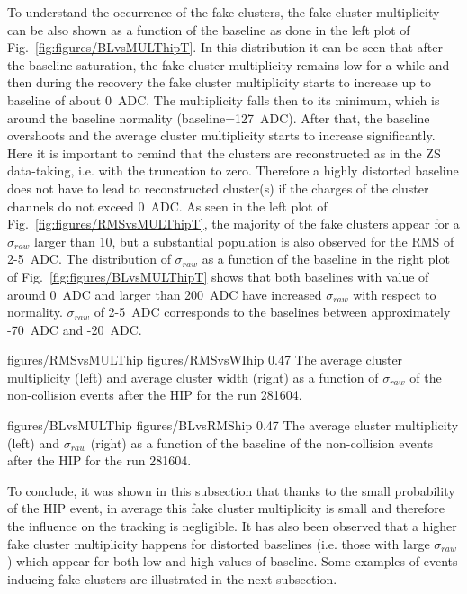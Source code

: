 To understand the occurrence of the fake clusters, the fake cluster multiplicity can be also shown as a function of the baseline as done in the left plot of Fig.~\ref{fig:figures/BLvsMULThipT}. In this distribution it can be seen that after the baseline saturation, the fake cluster multiplicity remains low for a while and then during the recovery the fake cluster multiplicity starts to increase up to baseline of about 0~ADC. The multiplicity falls then to its minimum, which is around the baseline normality (baseline=127~ADC). After that, the baseline overshoots and the average cluster multiplicity starts to increase significantly. Here it is important to remind that the clusters are reconstructed as in the ZS data-taking, i.e. with the truncation to zero. Therefore a highly distorted baseline does not have to lead to reconstructed cluster(s) if the charges of the cluster channels do not exceed 0~ADC.  As seen in the left plot of Fig.~\ref{fig:figures/RMSvsMULThipT}, the majority of the fake clusters appear for a $\sigma_{raw}$ larger than 10, but a substantial population is also observed for the RMS of 2-5~ADC. The distribution of  $\sigma_{raw}$ as a function of the baseline in the right plot of Fig.~\ref{fig:figures/BLvsMULThipT} shows that both baselines with value of around 0~ADC and larger than 200~ADC have increased $\sigma_{raw}$ with respect to normality. $\sigma_{raw}$ of 2-5~ADC corresponds to the baselines between approximately -70~ADC and -20~ADC. 

                 {figures/RMSvsMULThip} %
                 {figures/RMSvsWIhip} %
                 {0.47}       %
                 {The average cluster multiplicity (left) and average cluster width (right) as a function of $\sigma_{raw}$ of the non-collision events after the HIP for the run 281604.  } %

                 {figures/BLvsMULThip} %
                 {figures/BLvsRMShip} %
                 {0.47}       %
                 { The average cluster multiplicity (left) and $\sigma_{raw}$ (right) as a function of the baseline  of the non-collision events after the HIP for the run 281604. } %




To conclude, it was shown in this subsection that thanks to the small probability of the HIP event, in average this fake cluster multiplicity is small and therefore the influence on the tracking is negligible. It has also been observed that a higher fake cluster multiplicity happens for distorted baselines (i.e. those with large $\sigma_{raw}$) which appear for both low and high values of baseline. Some examples of events inducing fake clusters are illustrated in the next subsection.

